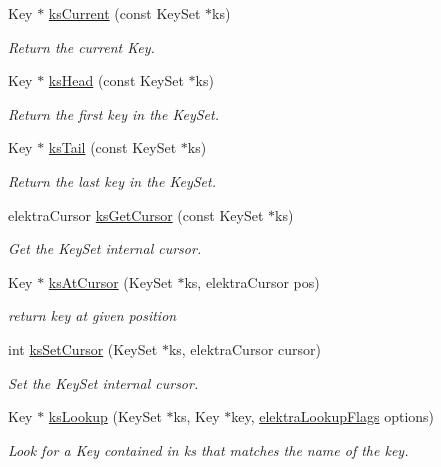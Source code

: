\begin{DoxyCompactItemize}
Key $\ast$ \hyperlink{group__keyset_ga4287b9416912c5f2ab9c195cb74fb094}{ks\+Current} (const Key\+Set $\ast$ks)
\begin{DoxyCompactList}\small\item\em Return the current Key. \end{DoxyCompactList}\item 
Key $\ast$ \hyperlink{group__keyset_gae7dbf3aef70e67b5328475eb3d1f92f5}{ks\+Head} (const Key\+Set $\ast$ks)
\begin{DoxyCompactList}\small\item\em Return the first key in the Key\+Set. \end{DoxyCompactList}\item 
Key $\ast$ \hyperlink{group__keyset_gadca442c4ab43cf532b15091d7711559e}{ks\+Tail} (const Key\+Set $\ast$ks)
\begin{DoxyCompactList}\small\item\em Return the last key in the Key\+Set. \end{DoxyCompactList}\item 
elektra\+Cursor \hyperlink{group__keyset_gace0444eb8ec958a429794f8586fc72e7}{ks\+Get\+Cursor} (const Key\+Set $\ast$ks)
\begin{DoxyCompactList}\small\item\em Get the Key\+Set internal cursor. \end{DoxyCompactList}\item 
Key $\ast$ \hyperlink{group__keyset_ga12b8fefaa20546e4790d60338b0db836}{ks\+At\+Cursor} (Key\+Set $\ast$ks, elektra\+Cursor pos)
\begin{DoxyCompactList}\small\item\em return key at given position \end{DoxyCompactList}\item 
int \hyperlink{group__keyset_ga28b2a7d13c620b3c9d4815a0608c738f}{ks\+Set\+Cursor} (Key\+Set $\ast$ks, elektra\+Cursor cursor)
\begin{DoxyCompactList}\small\item\em Set the Key\+Set internal cursor. \end{DoxyCompactList}\item 
Key $\ast$ \hyperlink{group__keyset_ga60f1ddcf23272f2b29b90e92ebe9b56f}{ks\+Lookup} (Key\+Set $\ast$ks, Key $\ast$key, \hyperlink{group__keyset_gada05f4bbf46fde81d0d57df86e73d914}{elektra\+Lookup\+Flags} options)
\begin{DoxyCompactList}\small\item\em Look for a Key contained in {\ttfamily ks} that matches the name of the {\ttfamily key}. \end{DoxyCompactList}\item 

\end{DoxyCompactItemize}
